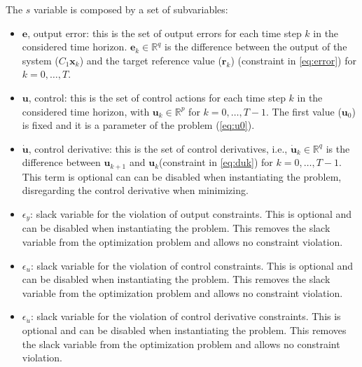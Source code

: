 \documentclass[10pt,a4paper]{article}
\newcommand{\xk}{\ensuremath{\bm{x}_k}\xspace}
\newcommand{\uk}{\ensuremath{\bm{u}_k}\xspace}
\newcommand{\ukk}{\ensuremath{\bm{u}_{k+1}}\xspace}
\newcommand{\uu}[1]{\ensuremath{\bm{u}_{#1}}\xspace}
\newcommand{\duk}{\ensuremath{\bm{\dot{u}}_k}\xspace}
\newcommand{\ek}{\ensuremath{\bm{e}_k}\xspace}
\newcommand{\rk}{\ensuremath{\bm{r}_k}\xspace}
\newcommand{\epsy}{\ensuremath{\epsilon_{y}}\xspace}
\newcommand{\epsu}{\ensuremath{\epsilon_{u}}\xspace}
\newcommand{\epsdu}{\ensuremath{\epsilon_{\dot{u}}}\xspace}
\newcommand{\R}{\ensuremath{\mathbb{R}\xspace}}
\newcommand{\Co}{\ensuremath{C_1}}
\begin{document}
The $s$ variable is composed by a set of subvariables:
\begin{itemize}
    \item $\bm{e}$, output error: this is the set of output errors for each time step $k$ in the considered time horizon. $\ek \in \R^q$ is the difference between the output of the system ($\Co\xk$) and the target reference value ($\rk$) (constraint in \cref{eq:error}) for $k = 0,\dots,T$.
    \item $\bm{u}$, control: this is the set of control actions for each time step $k$ in the considered time horizon, with $\uk \in \R^p$ for $k = 0,\dots,T-1$. The first value (\uu{0}) is fixed and it is a parameter of the problem (\cref{eq:u0}).
    \item $\bm{\dot{u}}$, control derivative: this is the set of control derivatives, i.e., $\duk \in \R^q$ is the difference between \ukk and \uk (constraint in \cref{eq:duk}) for $k = 0,\dots,T-1$. This term is optional can can be disabled when instantiating the problem, disregarding the control derivative when minimizing.
    \item \epsy: slack variable for the violation of output constraints. This is optional and can be disabled when instantiating the problem. This removes the slack variable from the optimization problem and allows no constraint violation.
    \item \epsu: slack variable for the violation of control constraints. This is optional and can be disabled when instantiating the problem. This removes the slack variable from the optimization problem and allows no constraint violation.
    \item \epsdu: slack variable for the violation of control derivative constraints. This is optional and can be disabled when instantiating the problem. This removes the slack variable from the optimization problem and allows no constraint violation.
\end{itemize}
\end{document}

